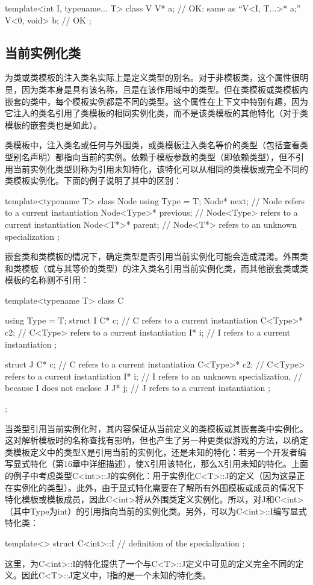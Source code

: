 \begin{cpp}
template<int I, typename... T> class V {
	V* a; // OK: same as “V<I, T...>* a;”
	V<0, void> b; // OK
};
\end{cpp}

\subsection{当前实例化类}

为类或类模板的注入类名实际上是定义类型的别名。对于非模板类，这个属性很明显，因为类本身是具有该名称，且是在该作用域中的类型。但在类模板或类模板内嵌套的类中，每个模板实例都是不同的类型。这个属性在上下文中特别有趣，因为它注入的类名引用了类模板的相同实例化类，而不是该类模板的其他特化（对于类模板的嵌套类也是如此）。

类模板中，注入类名或任何与外围类，或类模板注入类名等价的类型（包括查看类型别名声明）都指向当前的实例。依赖于模板参数的类型（即依赖类型），但不引用当前实例化类型则称为引用未知特化，该特化可以从相同的类模板或完全不同的类模板实例化。下面的例子说明了其中的区别：

\begin{cpp}
template<typename T> class Node {
	using Type = T;
	Node* next; // Node refers to a current instantiation
	Node<Type>* previous; // Node<Type> refers to a current instantiation
	Node<T*>* parent; // Node<T*> refers to an unknown specialization
};
\end{cpp}

嵌套类和类模板的情况下，确定类型是否引用当前实例化可能会造成混淆。外围类和类模板（或与其等价的类型）的注入类名引用当前实例化类，而其他嵌套类或类模板的名称则不引用：

\begin{cpp}
template<typename T> class C {
	using Type = T;
	struct I {
		C* c; // C refers to a current instantiation
		C<Type>* c2; // C<Type> refers to a current instantiation
		I* i; // I refers to a current instantiation
	};

	struct J {
		C* c; // C refers to a current instantiation
		C<Type>* c2; // C<Type> refers to a current instantiation
		I* i; // I refers to an unknown specialization,
			  // because I does not enclose J
		J* j; // J refers to a current instantiation
	};
};
\end{cpp}

当类型引用当前实例化时，其内容保证从当前定义的类模板或其嵌套类中实例化。这对解析模板时的名称查找有影响，但也产生了另一种更类似游戏的方法，以确定类模板定义中的类型X是引用当前的实例化，还是未知的特化：若另一个开发者编写显式特化（第16章中详细描述），使X引用该特化，那么X引用未知的特化。上面的例子中考虑类型C<int>::J的实例化：用于实例化C<T>::J的定义（因为这是正在实例化的类型）。此外，由于显式特化需要在了解所有外围模板或成员的情况下特化模板或模板成员，因此C<int>将从外围类定义实例化。所以，对J和C<int>（其中Type为int）的引用指向当前的实例化类。另外，可以为C<int>::I编写显式特化类：

\begin{cpp}
template<> struct C<int>::I {
	// definition of the specialization
};
\end{cpp}

这里，为C<int>::I的特化提供了一个与C<T>::J定义中可见的定义完全不同的定义。因此C<T>::J定义中，I指的是一个未知的特化类。


